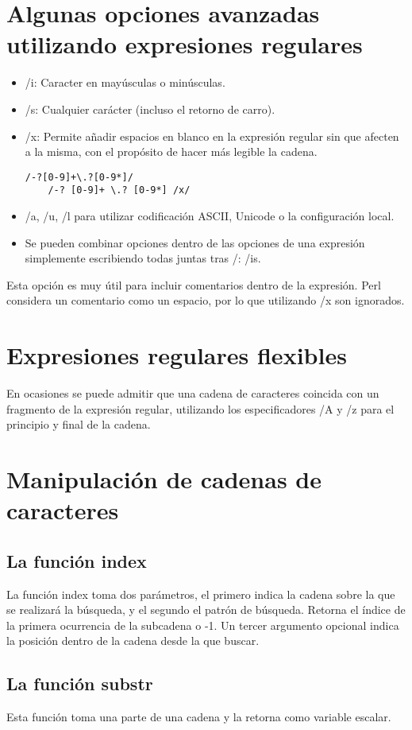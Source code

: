 \documentclass[12pt,a4paper]{memoir}
\begin{document}
	\section{Algunas opciones avanzadas utilizando expresiones regulares}
	\begin{itemize}
	\item /i: Caracter en mayúsculas o minúsculas.
	\item /s: Cualquier carácter (incluso el retorno de carro).
	\item /x: Permite añadir espacios en blanco en la expresión regular sin que afecten a la misma, con el propósito de hacer más legible la cadena.
	\lstset{language=Perl, showspaces=false}
	\begin{lstlisting}[frame=single, showspaces=false]
	/-?[0-9]+\.?[0-9*]/
	/-? [0-9]+ \.? [0-9*] /x/
	\end{lstlisting}
	\item /a, /u, /l para utilizar codificación ASCII, Unicode o la configuración local.
	\item Se pueden combinar opciones dentro de las opciones de una expresión simplemente escribiendo todas juntas tras /: /is.
	\end{itemize}
	Esta opción es muy útil para incluir comentarios dentro de la expresión. Perl considera un comentario como un espacio, por lo que utilizando /x son ignorados.
	\section{Expresiones regulares flexibles}
	En ocasiones se puede admitir que una cadena de caracteres coincida con un fragmento de la expresión regular, utilizando los especificadores /A y /z para el principio y final de la cadena.
	\section{Manipulación de cadenas de caracteres}
	\subsection{La función index}
	La función index toma dos parámetros, el primero indica la cadena sobre la que se realizará la búsqueda, y el segundo el patrón de búsqueda. Retorna el índice de la primera ocurrencia de la subcadena o -1. Un tercer argumento opcional indica la posición dentro de la cadena desde la que buscar.
	\subsection{La función substr}
	Esta función toma una parte de una cadena y la retorna como variable escalar.
\end{document}
